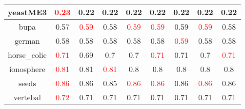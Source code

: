 \documentclass{article}%
\begin{document}
\begin{tabular}{c|cccccccc}
\hline%
yeastME3&\textcolor{red}{ 
0.23
}&0.22&0.22&0.22&0.22&0.22&0.22&0.22\\%
\hline%
bupa&0.57&\textcolor{red}{ 
0.59
}&0.58&\textcolor{red}{ 
0.59
}&\textcolor{red}{ 
0.59
}&0.59&\textcolor{red}{ 
0.59
}&0.58\\%
\hline%
german&0.58&0.58&0.58&0.58&0.58&\textcolor{red}{ 
0.59
}&0.58&0.58\\%
\hline%
horse\_colic&\textcolor{red}{ 
0.71
}&0.69&0.7&0.7&\textcolor{red}{ 
0.71
}&0.71&0.7&\textcolor{red}{ 
0.71
}\\%
\hline%
ionosphere&\textcolor{red}{ 
0.81
}&0.81&\textcolor{red}{ 
0.81
}&0.8&0.8&0.8&0.8&0.8\\%
\hline%
seeds&\textcolor{red}{ 
0.86
}&0.86&0.85&\textcolor{red}{ 
0.86
}&\textcolor{red}{ 
0.86
}&0.86&\textcolor{red}{ 
0.86
}&0.86\\%
\hline%
vertebal&\textcolor{red}{ 
0.72
}&0.71&0.71&0.71&0.71&0.71&0.71&0.71\\%
\hline%
\end{tabular}

%
\end{document}
